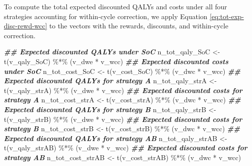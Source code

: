 \documentclass[
]{article}
\newenvironment{Shaded}{\begin{snugshade}}{\end{snugshade}}
\newcommand{\DocumentationTok}[1]{\textcolor[rgb]{0.56,0.35,0.01}{\textbf{\textit{#1}}}}
\newcommand{\FunctionTok}[1]{\textcolor[rgb]{0.00,0.00,0.00}{#1}}
\newcommand{\NormalTok}[1]{#1}
\newcommand{\OtherTok}[1]{\textcolor[rgb]{0.56,0.35,0.01}{#1}}
\newcommand{\SpecialCharTok}[1]{\textcolor[rgb]{0.00,0.00,0.00}{#1}}
\begin{document}
To compute the total expected discounted QALYs and costs under all four strategies accounting for within-cycle correction, we apply Equation \eqref{eq:tot-exp-disc-rewd-wcc} to the vectors with the rewards, discounts, and within-cycle correction.

\begin{Shaded}
\begin{Highlighting}[]
\DocumentationTok{\#\# Expected discounted QALYs under SoC}
\NormalTok{n\_tot\_qaly\_SoC }\OtherTok{\textless{}{-}} \FunctionTok{t}\NormalTok{(v\_qaly\_SoC) }\SpecialCharTok{\%*\%}\NormalTok{ (v\_dwe }\SpecialCharTok{*}\NormalTok{ v\_wcc)}
\DocumentationTok{\#\# Expected discounted costs under SoC}
\NormalTok{n\_tot\_cost\_SoC }\OtherTok{\textless{}{-}} \FunctionTok{t}\NormalTok{(v\_cost\_SoC) }\SpecialCharTok{\%*\%}\NormalTok{ (v\_dwc }\SpecialCharTok{*}\NormalTok{ v\_wcc)}
\DocumentationTok{\#\# Expected discounted QALYs for strategy A}
\NormalTok{n\_tot\_qaly\_strA }\OtherTok{\textless{}{-}} \FunctionTok{t}\NormalTok{(v\_qaly\_strA) }\SpecialCharTok{\%*\%}\NormalTok{ (v\_dwe }\SpecialCharTok{*}\NormalTok{ v\_wcc)}
\DocumentationTok{\#\# Expected discounted costs for strategy A}
\NormalTok{n\_tot\_cost\_strA }\OtherTok{\textless{}{-}} \FunctionTok{t}\NormalTok{(v\_cost\_strA) }\SpecialCharTok{\%*\%}\NormalTok{ (v\_dwc }\SpecialCharTok{*}\NormalTok{ v\_wcc)}
\DocumentationTok{\#\# Expected discounted QALYs for strategy B}
\NormalTok{n\_tot\_qaly\_strB }\OtherTok{\textless{}{-}} \FunctionTok{t}\NormalTok{(v\_qaly\_strB) }\SpecialCharTok{\%*\%}\NormalTok{ (v\_dwe }\SpecialCharTok{*}\NormalTok{ v\_wcc)}
\DocumentationTok{\#\# Expected discounted costs for strategy B}
\NormalTok{n\_tot\_cost\_strB }\OtherTok{\textless{}{-}} \FunctionTok{t}\NormalTok{(v\_cost\_strB) }\SpecialCharTok{\%*\%}\NormalTok{ (v\_dwc }\SpecialCharTok{*}\NormalTok{ v\_wcc)}
\DocumentationTok{\#\# Expected discounted QALYs for strategy AB}
\NormalTok{n\_tot\_qaly\_strAB }\OtherTok{\textless{}{-}} \FunctionTok{t}\NormalTok{(v\_qaly\_strAB) }\SpecialCharTok{\%*\%}\NormalTok{ (v\_dwe }\SpecialCharTok{*}\NormalTok{ v\_wcc)}
\DocumentationTok{\#\# Expected discounted costs for strategy AB}
\NormalTok{n\_tot\_cost\_strAB }\OtherTok{\textless{}{-}} \FunctionTok{t}\NormalTok{(v\_cost\_strAB) }\SpecialCharTok{\%*\%}\NormalTok{ (v\_dwc }\SpecialCharTok{*}\NormalTok{ v\_wcc)}
\end{Highlighting}
\end{Shaded}
\end{document}
